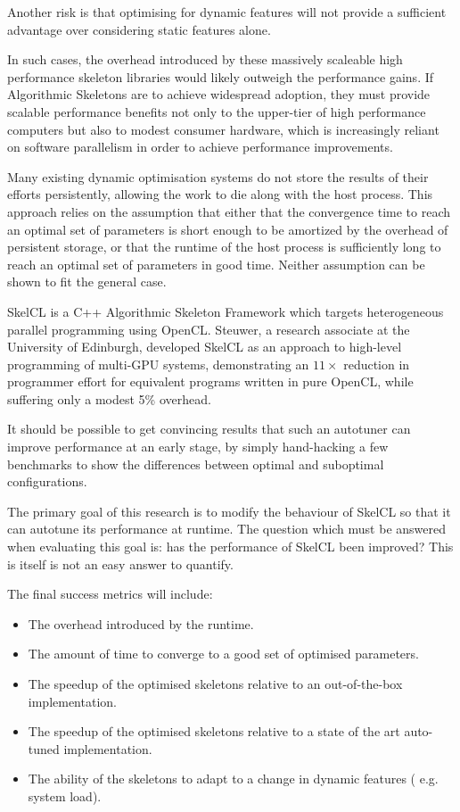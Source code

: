 Another risk is that optimising for dynamic features will not provide
a sufficient advantage over considering static features alone.


In such cases, the overhead introduced by these massively scaleable
high performance skeleton libraries would likely outweigh the
performance gains. If Algorithmic Skeletons are to achieve widespread
adoption, they must provide scalable performance benefits not only to
the upper-tier of high performance computers but also to modest
consumer hardware, which is increasingly reliant on software
parallelism in order to achieve performance improvements.


Many existing dynamic optimisation systems do not store the results of
their efforts persistently, allowing the work to die along with the
host process. This approach relies on the assumption that either that
the convergence time to reach an optimal set of parameters is short
enough to be amortized by the overhead of persistent storage, or that
the runtime of the host process is sufficiently long to reach an
optimal set of parameters in good time. Neither assumption can be
shown to fit the general case.

SkelCL is a C++ Algorithmic Skeleton Framework which targets
heterogeneous parallel programming using OpenCL. Steuwer, a research
associate at the University of Edinburgh, developed SkelCL as an
approach to high-level programming of multi-GPU systems, demonstrating
an $11\times$ reduction in programmer effort for equivalent programs
written in pure OpenCL, while suffering only a modest 5\% overhead.

It should be possible to get convincing results that such an autotuner
can improve performance at an early stage, by simply hand-hacking a
few benchmarks to show the differences between optimal and suboptimal
configurations.

The primary goal of this research is to modify the behaviour of SkelCL
so that it can autotune its performance at runtime. The question which
must be answered when evaluating this goal is: has the performance of
SkelCL been improved? This is itself is not an easy answer to
quantify.

The final success metrics will include:

\begin{itemize}
\item The overhead introduced by the runtime.
\item The amount of time to converge to a good set of optimised
parameters.
\item The speedup of the optimised skeletons relative to an
out-of-the-box implementation.
\item The speedup of the optimised skeletons relative to a state of the
art auto-tuned implementation.
\item The ability of the skeletons to adapt to a change in dynamic features (
e.g. system load).
\end{itemize}

